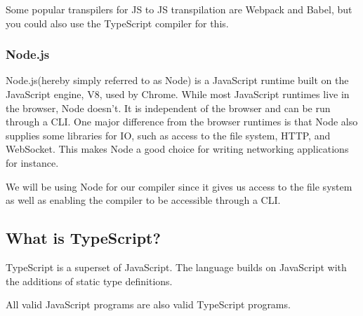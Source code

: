 Some popular transpilers for JS to JS transpilation are Webpack and Babel, but you could also use the TypeScript compiler for this.

\subsubsection{Node.js}

Node.js(hereby simply referred to as Node) is a JavaScript runtime built on the JavaScript engine, V8, used by Chrome.
While most JavaScript runtimes live in the browser, Node doesn't.
It is independent of the browser and can be run through a CLI.
One major difference from the browser runtimes is that Node also supplies some libraries for IO, such as access to the file system, HTTP, and WebSocket.
This makes Node a good choice for writing networking applications for instance.

We will be using Node for our compiler since it gives us access to the file system as well as enabling the compiler to be accessible through a CLI.

\subsection{What is TypeScript?}\label{subsec:what-is-typescript}

TypeScript is a superset of JavaScript.
The language builds on JavaScript with the additions of static type definitions\cite{tswebsite}.

All valid JavaScript programs are also valid TypeScript programs.
